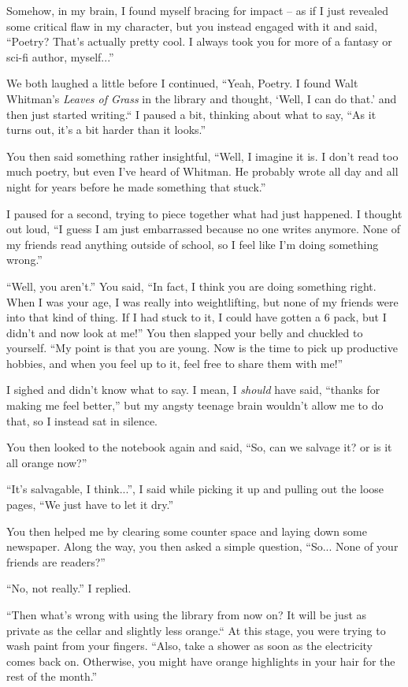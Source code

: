 Somehow, in my brain, I found myself bracing for impact -- as if I just revealed some critical flaw in my character, but you instead engaged with it and said,
``Poetry? That's actually pretty cool. I always took you for more of a fantasy or sci-fi author, myself...''

We both laughed a little before I continued, ``Yeah, Poetry. I found Walt Whitman's \textit{Leaves of Grass} in the library and thought, `Well, I can do that.' and then just started writing.`` I paused a bit, thinking about what to say, ``As it turns out, it's a bit harder than it looks.''

You then said something rather insightful, ``Well, I imagine it is. I don't read too much poetry, but even I've heard of Whitman. He probably wrote all day and all night for years before he made something that stuck.''

I paused for a second, trying to piece together what had just happened.
I thought out loud, ``I guess I am just embarrassed because no one writes anymore.
None of my friends read anything outside of school, so I feel like I'm doing something wrong.''

``Well, you aren't.'' You said, ``In fact, I think you are doing something right.
When I was your age, I was really into weightlifting, but none of my friends were into that kind of thing.
If I had stuck to it, I could have gotten a 6 pack, but I didn't and now look at me!''
You then slapped your belly and chuckled to yourself.
``My point is that you are young. Now is the time to pick up productive hobbies, and when you feel up to it, feel free to share them with me!''

I sighed and didn't know what to say.
I mean, I \textit{should} have said, ``thanks for making me feel better,'' but my angsty teenage brain wouldn't allow me to do that, so I instead sat in silence.

You then looked to the notebook again and said, ``So, can we salvage it? or is it all orange now?''

``It's salvagable, I think...'', I said while picking it up and pulling out the loose pages, ``We just have to let it dry.''

You then helped me by clearing some counter space and laying down some newspaper.
Along the way, you then asked a simple question, ``So... None of your friends are readers?''

``No, not really.'' I replied.

``Then what's wrong with using the library from now on? It will be just as private as the cellar and slightly less orange.`` At this stage, you were trying to wash paint from your fingers. ``Also, take a shower as soon as the electricity comes back on. Otherwise, you might have orange highlights in your hair for the rest of the month.''

